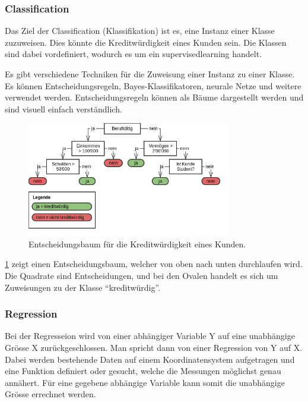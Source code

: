 \subsubsection{Classification}
\label{sec:recherche:dataminingtechniken:disziplinen:classification}
Das Ziel der Classification (Klassifikation) ist es, eine Instanz einer Klasse zuzuweisen. Dies könnte die Kreditwürdigkeit eines Kunden sein. Die Klassen sind dabei vordefiniert, wodurch es um ein \gls{supervisedlearning} handelt.

Es gibt verschiedene Techniken für die Zuweisung einer Instanz zu einer Klasse. Es können Entscheidungsregeln, Bayes-Klassifikatoren, neurale Netze und weitere verwendet werden. Entscheidungsregeln können als Bäume dargestellt werden und sind visuell einfach verständlich.

\begin{figure}[H]
	\centering
	\includegraphics[width=0.8\textwidth]{images/decision_tree.png}
	\caption{Entscheidungsbaum für die Kreditwürdigkeit eines Kunden.}
	\label{fig:recherche:dataminingtechniken:disziplinen:classification}
\end{figure}

\cref{fig:recherche:dataminingtechniken:disziplinen:classification} zeigt einen Entscheidungsbaum, welcher von oben nach unten durchlaufen wird. Die Quadrate sind Entscheidungen, und bei den Ovalen handelt es sich um Zuweisungen zu der Klasse "`kreditwürdig"'.


\subsubsection{Regression}
\label{sec:recherche:dataminingtechniken:disziplinen:regression}
Bei der Regresseion wird von einer abhängiger Variable Y auf eine unabhängige Grösse X zurückgeschlossen. Man spricht dann von einer Regression von Y auf X. Dabei werden bestehende Daten auf einem Koordinatensystem aufgetragen und eine Funktion definiert oder gesucht, welche die Messungen möglichst genau annähert. Für eine gegebene abhängige Variable kann somit die unabhängige Grösse errechnet werden. 

